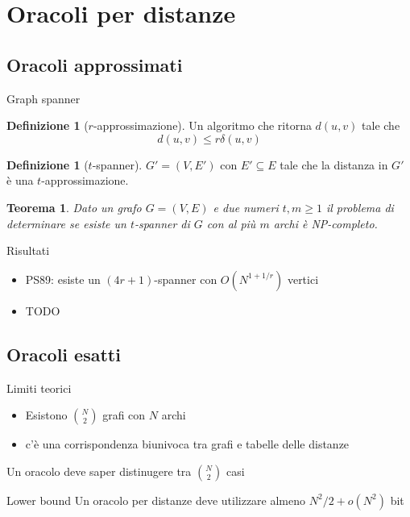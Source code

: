 \documentclass{beamer}
\newcounter{counter1}
\theoremstyle{plain}
\newtheorem{myteo}[counter1]{Teorema}
\theoremstyle{definition}
\newtheorem{mydef}[counter1]{Definizione}
\theoremstyle{remark}
\newcommand{\pa}[1]{\left(#1\right)}
\begin{document}
\section{Oracoli per distanze}

\subsection{Oracoli approssimati}

\begin{frame}{Graph spanner}
  \begin{mydef}[$r$-approssimazione]
    Un algoritmo che ritorna $d(u,v)$ tale che
    \[ d\pa{u,v} \le r \delta\pa{u,v} \]
  \end{mydef}

  \begin{mydef}[$t$-spanner]
    $G' = (V,E')$ con $E' \subseteq E$ tale che la distanza in $G'$
    \`e una $t$-approssimazione.
  \end{mydef}

  \begin{myteo}
    Dato un grafo $G = (V,E)$ e due numeri $t,m\ge 1$ il problema di
    determinare se esiste un $t$-spanner di $G$ con al pi\`u $m$ archi
    \`e NP-completo.
  \end{myteo}
\end{frame}

\begin{frame}{Risultati}
  \begin{itemize}
  \item PS89: esiste un $(4r+1)$-spanner con $O(N^{1+1/r})$ vertici
  \item TODO
  \end{itemize}
\end{frame}

\subsection{Oracoli esatti}

\begin{frame}{Limiti teorici}
  \begin{itemize}
  \item Esistono $\binom{ N}{2}$ grafi con $N$ archi
  \item c'\`e una corrispondenza biunivoca tra grafi e tabelle delle
    distanze 
  \end{itemize}
  \pause
  \vfill
  Un oracolo deve saper distinugere tra $\binom{ N}{2}$ casi
  \pause
  \begin{block}{Lower bound}
    Un oracolo per distanze deve utilizzare almeno $N^2 / 2 + o(N^2)$
    bit
  \end{block}
\end{frame}
\end{document}
